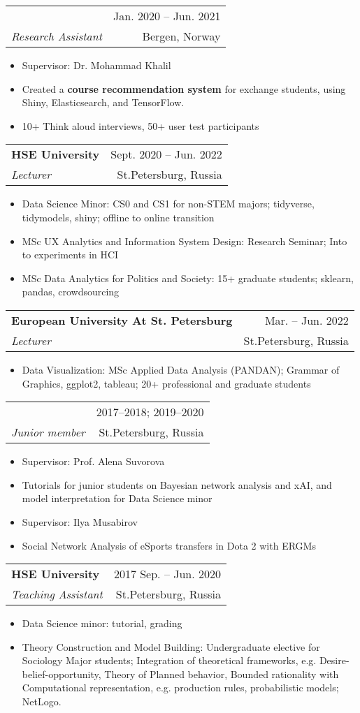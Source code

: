 \documentclass[letterpaper,11pt]{article}
\makeatletter
\newcommand{\myuline}[1]{%
  \uline{\phantom{#1}}%
  \llap{\contour{white}{#1}}%
}
\newcommand{\MYhref}[2]{
\myuline{\href{#1}{{#2}}}
}%
\newcommand{\resumeItem}[1]{
  \item\small{
    {#1 \vspace{-1pt}}
  }
}
\newcommand{\resumeSubheading}[4]{
  \vspace{-10pt}\item
    \begin{tabular*}{\textwidth}[t]{l@{\extracolsep{\fill}}r}
      \textbf{#1} & {\color{dark-grey}\small #2}\vspace{1pt}\\ %
      \hspace{2pt}\textit{#3} & {\color{dark-grey} \small #4}\\ %
    \end{tabular*}\vspace{-4pt}
}
\newcommand{\resumeItemListStart}{\begin{itemize}[label={-}]}
\newcommand{\resumeItemListEnd}{\end{itemize}\vspace{0pt}}
\makeatother
\begin{document}
    \resumeSubheading
      {\MYhref{https://slate.uib.no}{SLATE} Center at University of Bergen}{Jan. 2020 -- Jun. 2021}
      {Research Assistant}{Bergen, Norway}
      \resumeItemListStart
        \resumeItem{Supervisor: Dr. Mohammad Khalil}
        \resumeItem{Created a \textbf{course recommendation system} for exchange students, using Shiny, Elasticsearch, and TensorFlow.}
        \resumeItem{10+ Think aloud interviews, 50+ user test participants}
    \resumeItemListEnd

    \resumeSubheading
      {HSE University}{Sept. 2020 -- Jun. 2022}
      {Lecturer}{St.Petersburg, Russia}
      \resumeItemListStart
        \resumeItem{Data Science Minor: CS0 and CS1 for non-STEM majors; tidyverse, tidymodels, shiny; offline to online transition}
        \resumeItem{MSc UX Analytics and Information System Design: Research Seminar; Into to experiments in HCI}
        \resumeItem{MSc Data Analytics for Politics and Society: 15+ graduate students; sklearn, pandas, crowdsourcing}
      \resumeItemListEnd
    \resumeSubheading
      {European University At St. Petersburg}{Mar. -- Jun. 2022}
      {Lecturer}{St.Petersburg, Russia}
      \resumeItemListStart
        \resumeItem{Data Visualization: MSc Applied Data Analysis (PANDAN); Grammar of Graphics, ggplot2, tableau; 20+ professional and graduate students}
      \resumeItemListEnd

    \resumeSubheading
    {\MYhref{https://spb.hse.ru/en/fmcs/math/sociocomp/}{SocComp} research group at HSE University}{2017--2018; 2019--2020}
    {Junior member}{St.Petersburg, Russia}
        \resumeItemListStart
        \resumeItem{Supervisor: Prof. Alena Suvorova}
        \resumeItem{Tutorials for junior students on Bayesian network analysis and xAI, and model interpretation for Data Science minor}
        \resumeItem{Supervisor: Ilya Musabirov}
        \resumeItem{Social Network Analysis of eSports transfers in Dota 2 with ERGMs}
        \resumeItemListEnd

        \resumeSubheading
    {HSE University}{2017 Sep. -- Jun. 2020}
    {Teaching Assistant}{St.Petersburg, Russia}
        \resumeItemListStart
        \resumeItem{Data Science minor: tutorial, grading}
        \resumeItem{Theory Construction and Model Building: Undergraduate elective for Sociology Major students; Integration of theoretical frameworks, e.g. Desire-belief-opportunity, Theory of Planned behavior, Bounded rationality with Computational representation, e.g. production rules,  probabilistic models; NetLogo.}
        \resumeItemListEnd
\end{document}
